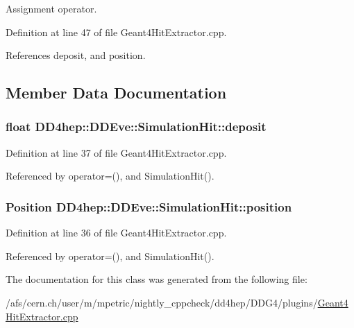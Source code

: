 Assignment operator. 

Definition at line 47 of file Geant4HitExtractor.cpp.

References deposit, and position.

\subsection{Member Data Documentation}
\hypertarget{class_d_d4hep_1_1_d_d_eve_1_1_simulation_hit_a96d56e1a81de2176ab0e856ba6394799}{
\subsubsection[{deposit}]{\setlength{\rightskip}{0pt plus 5cm}float DD4hep::DDEve::SimulationHit::deposit}}
\label{class_d_d4hep_1_1_d_d_eve_1_1_simulation_hit_a96d56e1a81de2176ab0e856ba6394799}


Definition at line 37 of file Geant4HitExtractor.cpp.

Referenced by operator=(), and SimulationHit().\hypertarget{class_d_d4hep_1_1_d_d_eve_1_1_simulation_hit_a3ac34457c4fec010a96bdd309c14544c}{
\subsubsection[{position}]{\setlength{\rightskip}{0pt plus 5cm}Position DD4hep::DDEve::SimulationHit::position}}
\label{class_d_d4hep_1_1_d_d_eve_1_1_simulation_hit_a3ac34457c4fec010a96bdd309c14544c}


Definition at line 36 of file Geant4HitExtractor.cpp.

Referenced by operator=(), and SimulationHit().

The documentation for this class was generated from the following file:\begin{DoxyCompactItemize}
\item 
/afs/cern.ch/user/m/mpetric/nightly\_\-cppcheck/dd4hep/DDG4/plugins/\hyperlink{_geant4_hit_extractor_8cpp}{Geant4HitExtractor.cpp}\end{DoxyCompactItemize}
